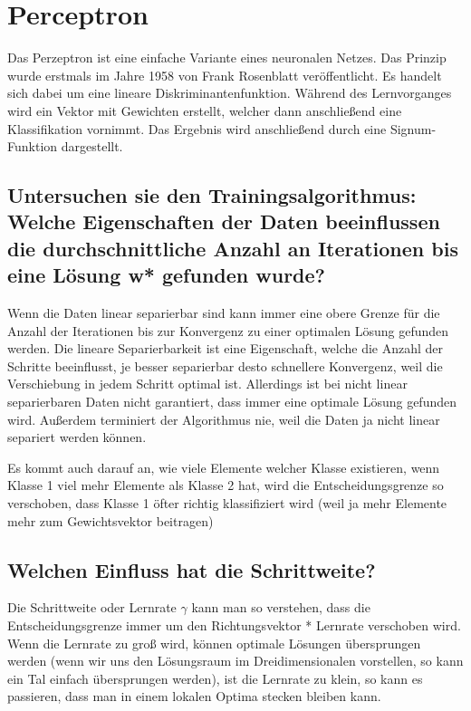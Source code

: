 \section{Perceptron}

Das Perzeptron ist eine einfache Variante eines neuronalen Netzes. Das Prinzip wurde erstmals im Jahre 1958 von Frank Rosenblatt veröffentlicht\cite{rosenblatt58}. Es handelt sich dabei um eine lineare Diskriminantenfunktion. Während des Lernvorganges wird ein Vektor mit Gewichten erstellt, welcher dann anschließend eine Klassifikation vornimmt. Das Ergebnis wird anschließend durch eine Signum-Funktion dargestellt.

\subsection{Untersuchen sie den Trainingsalgorithmus: Welche Eigenschaften der Daten beeinflussen die durchschnittliche Anzahl an Iterationen bis eine Lösung w* gefunden wurde?}
Wenn die Daten linear separierbar sind kann immer eine obere Grenze für die Anzahl der Iterationen bis zur Konvergenz zu einer optimalen Lösung gefunden werden.
Die lineare Separierbarkeit ist eine Eigenschaft, welche die Anzahl der Schritte beeinflusst, je besser separierbar desto schnellere Konvergenz, weil die Verschiebung in jedem Schritt optimal ist. Allerdings ist bei nicht linear separierbaren Daten nicht garantiert, dass immer eine optimale Lösung gefunden wird. Außerdem terminiert der Algorithmus nie, weil die Daten ja nicht linear separiert werden können. \par{Es kommt auch darauf an, wie viele Elemente welcher Klasse existieren, wenn Klasse 1 viel mehr Elemente als Klasse 2 hat, wird die Entscheidungsgrenze so verschoben, dass Klasse 1 öfter richtig klassifiziert wird (weil ja mehr Elemente mehr zum Gewichtsvektor beitragen)}

\subsection{Welchen Einfluss hat die Schrittweite?}
Die Schrittweite oder Lernrate $\gamma$ kann man so verstehen, dass die Entscheidungsgrenze immer um den Richtungsvektor * Lernrate verschoben wird. Wenn die Lernrate zu groß wird, können optimale Lösungen übersprungen werden (wenn wir uns den Lösungsraum im Dreidimensionalen vorstellen, so kann ein Tal einfach übersprungen werden), ist die Lernrate zu klein, so kann es passieren, dass man in einem lokalen Optima stecken bleiben kann.

